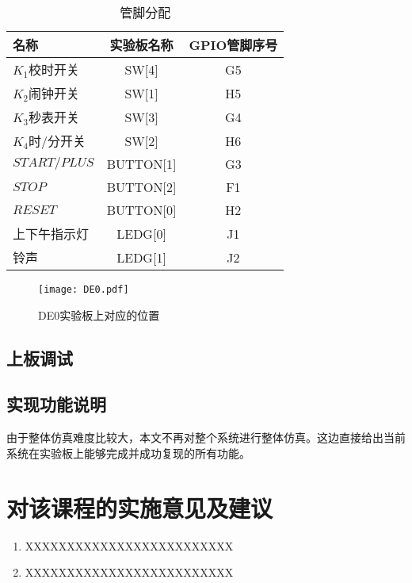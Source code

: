 \documentclass[12pt,AutoFakeBold]{article}
\begin{document}
\begin{table}[!htb]
    \begin{center}
    \caption{管脚分配}
    \begin{tabular}{lcc}
        \toprule
        名称    &实验板名称&GPIO管脚序号\\
        \midrule
        $K_1$校时开关   &SW[4]& G5\\ 
        $K_2$闹钟开关   &SW[1]& H5\\ 
        $K_3$秒表开关   &SW[3]& G4\\ 
        $K_4$时/分开关   &SW[2]& H6\\ 
        $START/PLUS$   &BUTTON[1]& G3\\ 
        $STOP$   &BUTTON[2] & F1\\ 
        $RESET$   &BUTTON[0] & H2\\ 
        上下午指示灯   &LEDG[0]& J1\\ 
        铃声   &LEDG[1]& J2\\ 
        \bottomrule
    \end{tabular}\label{tb:pin}
    \end{center}
\end{table}

\begin{figure}[htbp]
    \centering
    \texttt{[image: DE0.pdf]} 	%
    \caption{DE0实验板上对应的位置}		%
    \label{fig:DE0}							%
\end{figure}

\subsection{上板调试}


\subsection{实现功能说明}
由于整体仿真难度比较大，本文不再对整个系统进行整体仿真。这边直接给出当前系统在实验板上能够完成并成功复现的所有功能。



\section{对该课程的实施意见及建议}
\begin{enumerate}
    \item XXXXXXXXXXXXXXXXXXXXXXXXX
    \item XXXXXXXXXXXXXXXXXXXXXXXXX
\end{enumerate}
\end{document}
